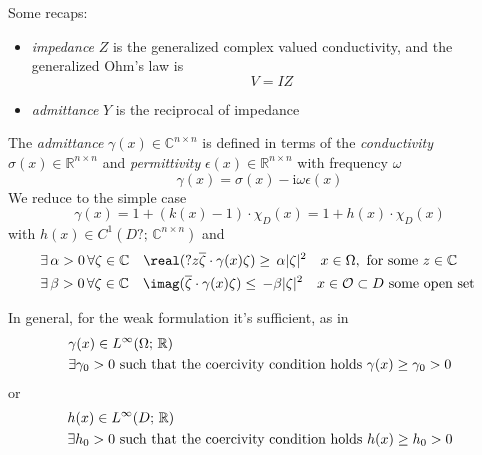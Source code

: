 \begin{definition}
 Some recaps:
 \begin{itemize}
  \item \emph{impedance} $Z$ is the generalized complex valued conductivity, and the generalized Ohm's law is 
  \begin{equation}
   V = IZ
  \end{equation}
  \item \emph{admittance} $Y$ is the reciprocal of impedance
 \end{itemize}
\end{definition}

\begin{assumption}
\label{assumption:admittance}
The \emph{admittance} $\gamma(x)\in\mathbb{C}^{n\times n}$ is defined in terms of the \emph{conductivity} $\sigma(x)\in\mathbb{R}^{n\times n}$ and \emph{permittivity} $\epsilon(x)\in\mathbb{R}^{n \times n}$ with frequency $\omega$
\begin{equation}
 \gamma(x) = \sigma(x) - \text{i}\omega \epsilon(x)
\end{equation}
We reduce to the simple case
\begin{equation}
 \gamma(x) = 1 + (k(x) - 1 ) \cdot \chi_D(x) = 1 + h(x)\cdot\chi_D(x)
\end{equation}
with $h(x) \in C^1(D?;\,\mathbb{C}^{n\times n})$ and
\begin{align}
 &\exists\, \alpha>0\,\forall \zeta \in \mathbb{C}\quad \real(?z\overline{\zeta}\cdot\gamma(x)\zeta)     \geq\,  \alpha|\zeta|^2 \quad x\in \Omega, \text{ for some } z \in \mathbb{C}\\
 &\exists\, \beta>0\,\forall \zeta \in \mathbb{C}\quad \imag(\overline{\zeta}\cdot\gamma(x)\zeta)        \leq\,  -\beta|\zeta|^2 \quad x\in \mathcal{O} \subset D \text{ some open set }
\end{align}
\end{assumption}
\begin{assumption}
In general, for the weak formulation it's sufficient, as in \cite{kirsch:book}
\begin{align}
 & \gamma(x)\in L^\infty(\Omega;\,\mathbb{R} ) \\
 & \exists \gamma_0>0\textup{ such that the coercivity condition holds }\gamma(x)\geq \gamma_0 > 0
\end{align}
or
\begin{align}
 & h(x)\in L^\infty(D;\,\mathbb{R} ) \\
 & \exists h_0>0\textup{ such that the coercivity condition holds }h(x)\geq h_0 > 0
\end{align}
\end{assumption}

